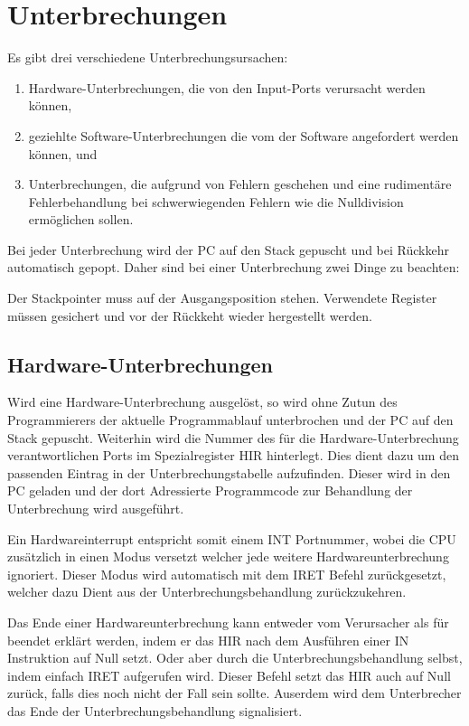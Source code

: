 \section{Unterbrechungen}
\label{sec:Unterbrechungen}


Es gibt drei verschiedene Unterbrechungsursachen:
\begin{enumerate}
 \item Hardware-Unterbrechungen, die von den Input-Ports verursacht werden
       können,
 \item geziehlte Software-Unterbrechungen die vom der Software angefordert
       werden können, und
 \item Unterbrechungen, die aufgrund von Fehlern geschehen und eine rudimentäre
       Fehlerbehandlung bei schwerwiegenden Fehlern wie die Nulldivision
       ermöglichen sollen.
\end{enumerate}

Bei jeder Unterbrechung wird der PC auf den Stack gepuscht und bei Rückkehr
automatisch gepopt. Daher sind bei einer Unterbrechung zwei Dinge zu beachten:

Der Stackpointer muss auf der Ausgangsposition stehen. Verwendete Register
müssen gesichert und vor der Rückkeht wieder hergestellt werden.


\subsection{Hardware-Unterbrechungen}
\label{subsec:Hardware-Unterbrechungen}

Wird eine Hardware-Unterbrechung ausgelöst, so wird ohne Zutun des
Programmierers der aktuelle Programmablauf unterbrochen und der PC auf den Stack
gepuscht. Weiterhin wird die Nummer des für die Hardware-Unterbrechung
verantwortlichen Ports im Spezialregister HIR hinterlegt. Dies dient dazu um den
passenden Eintrag in der Unterbrechungstabelle aufzufinden. Dieser wird in den
PC geladen und der dort Adressierte Programmcode zur Behandlung der
Unterbrechung wird ausgeführt. 

Ein Hardwareinterrupt entspricht somit einem INT Portnummer, wobei die CPU
zusätzlich in einen Modus versetzt welcher jede weitere Hardwareunterbrechung
ignoriert. Dieser Modus wird automatisch mit dem IRET Befehl zurückgesetzt,
welcher dazu Dient aus der Unterbrechungsbehandlung zurückzukehren.

Das Ende einer Hardwareunterbrechung kann entweder vom Verursacher als für
beendet erklärt werden, indem er das HIR nach dem Ausführen einer IN Instruktion
auf Null setzt. Oder aber durch die Unterbrechungsbehandlung selbst, indem
einfach IRET aufgerufen wird. Dieser Befehl setzt das HIR auch auf Null zurück,
falls dies noch nicht der Fall sein sollte. Auserdem wird dem Unterbrecher das
Ende der Unterbrechungsbehandlung signalisiert.

